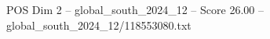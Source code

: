 \begin{textsample}{POS Dim 2 – global\_south\_2024\_12 – Score 26.00 – global\_south\_2024\_12/118553080.txt}
\end{textsample}
